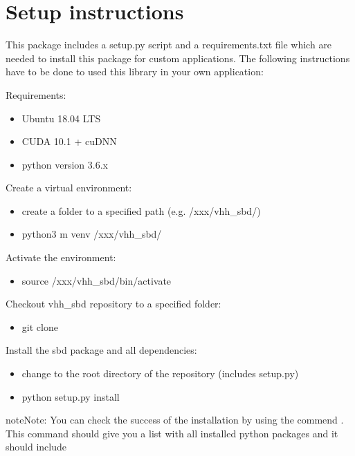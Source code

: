 \documentclass[letterpaper,10pt,english,openany,oneside]{sphinxmanual}
\begin{document}
\chapter{Setup  instructions}
\label{\detokenize{index:setup-instructions}}
This package includes a setup.py script and a requirements.txt file which are needed to install this package for custom
applications. The following instructions have to be done to used this library in your own application:

Requirements:
\begin{itemize}
\item {} 
Ubuntu 18.04 LTS

\item {} 
CUDA 10.1 + cuDNN

\item {} 
python version 3.6.x

\end{itemize}

Create a virtual environment:
\begin{itemize}
\item {} 
create a folder to a specified path (e.g. /xxx/vhh\_sbd/)

\item {} 
python3 \sphinxhyphen{}m venv /xxx/vhh\_sbd/

\end{itemize}

Activate the environment:
\begin{itemize}
\item {} 
source /xxx/vhh\_sbd/bin/activate

\end{itemize}

Checkout vhh\_sbd repository to a specified folder:
\begin{itemize}
\item {} 
git clone 

\end{itemize}

Install the sbd package and all dependencies:
\begin{itemize}
\item {} 
change to the root directory of the repository (includes setup.py)

\item {} 
python setup.py install

\end{itemize}

\begin{sphinxadmonition}{note}{Note:}
You can check the success of the installation by using the commend . This command should give you a list with all installed python packages and it should include 
\end{sphinxadmonition}
\end{document}
